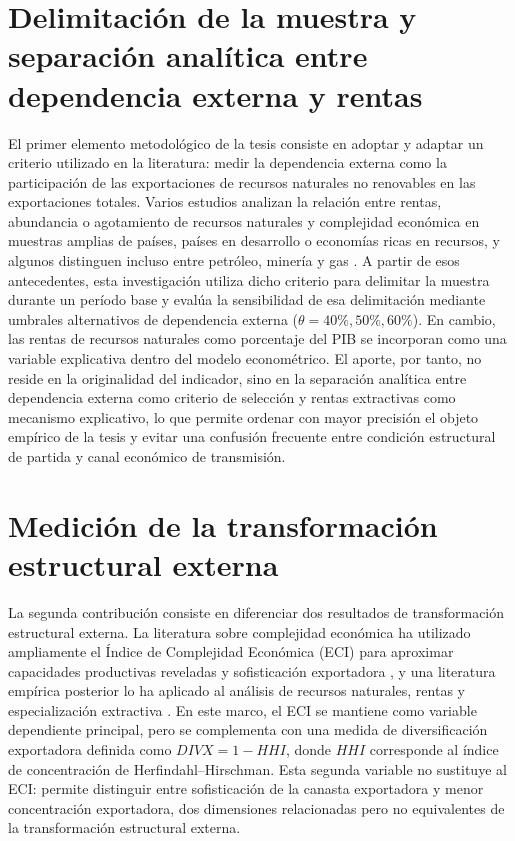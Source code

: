 \documentclass[../../PTFM.tex]{subfiles}
\begin{document}
	\section{Delimitación de la muestra y separación analítica entre dependencia externa y rentas}
	\label{sec:contribucion-muestra-rentas}

	El primer elemento metodológico de la tesis consiste en adoptar y adaptar un criterio utilizado en la literatura: medir la dependencia externa como la participación de las exportaciones de recursos naturales no renovables en las exportaciones totales. Varios estudios analizan la relación entre rentas, abundancia o agotamiento de recursos naturales y complejidad económica en muestras amplias de países, países en desarrollo o economías ricas en recursos, y algunos distinguen incluso entre petróleo, minería y gas \parencite{Canh2020,Hoang2023,Kelly2024,Li2024,Ul-Durar2023,Valentine2024,Zhang2023}. A partir de esos antecedentes, esta investigación utiliza dicho criterio para delimitar la muestra durante un período base y evalúa la sensibilidad de esa delimitación mediante umbrales alternativos de dependencia externa ($\theta=40\%, 50\%, 60\%$). En cambio, las rentas de recursos naturales como porcentaje del PIB se incorporan como una variable explicativa dentro del modelo econométrico. El aporte, por tanto, no reside en la originalidad del indicador, sino en la separación analítica entre dependencia externa como criterio de selección y rentas extractivas como mecanismo explicativo, lo que permite ordenar con mayor precisión el objeto empírico de la tesis y evitar una confusión frecuente entre condición estructural de partida y canal económico de transmisión.

	\section{Medición de la transformación estructural externa}
	\label{sec:contribucion-variables-resultado}

	La segunda contribución consiste en diferenciar dos resultados de transformación estructural externa. La literatura sobre complejidad económica ha utilizado ampliamente el Índice de Complejidad Económica (ECI) para aproximar capacidades productivas reveladas y sofisticación exportadora \parencite{Hausmann2007,Hidalgo2009,Hausmann2014}, y una literatura empírica posterior lo ha aplicado al análisis de recursos naturales, rentas y especialización extractiva \parencite{Ajide2022,Canh2020,Hoang2023,Owjimehr2024,Valentine2024,Zhang2023}. En este marco, el ECI se mantiene como variable dependiente principal, pero se complementa con una medida de diversificación exportadora definida como $DIVX=1-HHI$, donde $HHI$ corresponde al índice de concentración de Herfindahl--Hirschman. Esta segunda variable no sustituye al ECI: permite distinguir entre sofisticación de la canasta exportadora y menor concentración exportadora, dos dimensiones relacionadas pero no equivalentes de la transformación estructural externa.
\end{document}
